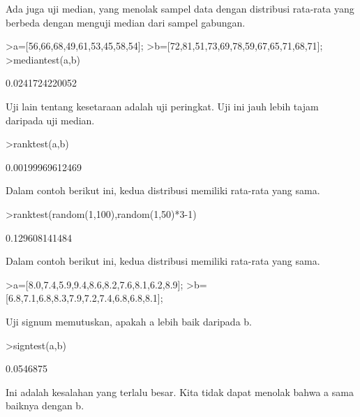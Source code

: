 \documentclass[a4paper,10pt]{article}
\begin{document}
\begin{eulernotebook}
\begin{eulercomment}
\begin{eulercomment}
\begin{eulercomment}
Ada juga uji median, yang menolak sampel data dengan distribusi
rata-rata yang berbeda dengan menguji median dari sampel gabungan.
\end{eulercomment}
\begin{eulerprompt}
>a=[56,66,68,49,61,53,45,58,54];
>b=[72,81,51,73,69,78,59,67,65,71,68,71];
>mediantest(a,b)
\end{eulerprompt}
\begin{euleroutput}
  0.0241724220052
\end{euleroutput}
\begin{eulercomment}
Uji lain tentang kesetaraan adalah uji peringkat. Uji ini jauh lebih
tajam daripada uji median.
\end{eulercomment}
\begin{eulerprompt}
>ranktest(a,b)
\end{eulerprompt}
\begin{euleroutput}
  0.00199969612469
\end{euleroutput}
\begin{eulercomment}
Dalam contoh berikut ini, kedua distribusi memiliki rata-rata yang
sama.
\end{eulercomment}
\begin{eulerprompt}
>ranktest(random(1,100),random(1,50)*3-1)
\end{eulerprompt}
\begin{euleroutput}
  0.129608141484
\end{euleroutput}
\begin{eulercomment}
Dalam contoh berikut ini, kedua distribusi memiliki rata-rata yang
sama.
\end{eulercomment}
\begin{eulerprompt}
>a=[8.0,7.4,5.9,9.4,8.6,8.2,7.6,8.1,6.2,8.9];
>b=[6.8,7.1,6.8,8.3,7.9,7.2,7.4,6.8,6.8,8.1];
\end{eulerprompt}
\begin{eulercomment}
Uji signum memutuskan, apakah a lebih baik daripada b.
\end{eulercomment}
\begin{eulerprompt}
>signtest(a,b)
\end{eulerprompt}
\begin{euleroutput}
  0.0546875
\end{euleroutput}
\begin{eulercomment}
Ini adalah kesalahan yang terlalu besar. Kita tidak dapat menolak
bahwa a sama baiknya dengan b.


\end{eulercomment}
\end{eulercomment}
\end{eulercomment}
\end{eulernotebook}
\end{document}
